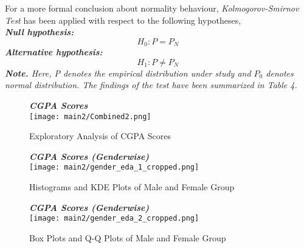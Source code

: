 \documentclass[12pt,a4paper]{report}
\begin{document}
\Large{For a more formal conclusion about normality behaviour, \textit{Kolmogorov-Smirnov Test} has been applied with respect to the following hypotheses,}\\[5pt]
\Large{\textit{\textbf{Null hypothesis:}}}
\begin{equation*}
 H_0: P = P_N   
\end{equation*}
\Large{\textit{\textbf{Alternative hypothesis:}}}
\begin{equation*}
 H_1: P \neq P_N   
\end{equation*}
\large{\textit{{\textbf{Note. }}Here, P denotes the empirical distribution under study and $P_0$ denotes normal distribution. The findings of the test have been summarized in Table 4.}}
\pagebreak
\begin{center}
\begin{figure}[hbt!]
    \centering
    \vspace{-30pt}
    \Large{\textit{\textbf{\hspace{12pt} CGPA Scores}}}\\[30pt]
    \texttt{[image: main2/Combined2.png]}
    \caption{Exploratory Analysis of CGPA Scores}
    \label{fig: cgpa}
\end{figure}
\end{center}
\pagebreak
\begin{center}
\begin{figure}[hbt!]
    \centering
    \vspace{-30pt}
    \Large{\textit{\textbf{\hspace{25pt}CGPA Scores (Genderwise)}}}\\[30pt]
    \texttt{[image: main2/gender\_eda\_1\_cropped.png]}
    \caption{Histograms and KDE Plots of Male and Female Group}
    \label{fig: cgpa}
\end{figure}
\end{center}
\pagebreak
\begin{center}
\begin{figure}[hbt!]
    \centering
    \vspace{-30pt}
    \Large{\textit{\textbf{\hspace{25pt}CGPA Scores (Genderwise)}}}\\[30pt]
    \texttt{[image: main2/gender\_eda\_2\_cropped.png]}
    \caption{Box Plots and Q-Q Plots of Male and Female Group}
    \label{fig: cgpa}
\end{figure}
\end{center}
\pagebreak
\end{document}
